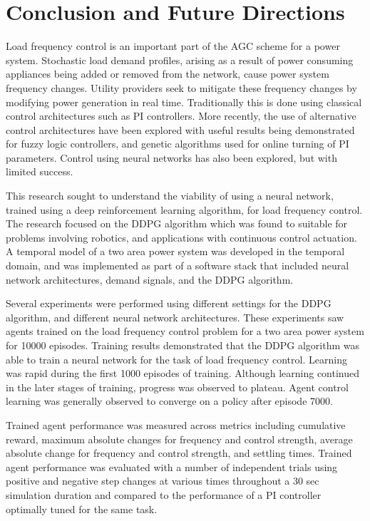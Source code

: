 \chapter{Conclusion and Future Directions}

Load frequency control is an important part of the AGC scheme for a power system. Stochastic load demand profiles, arising as a result of power consuming appliances being added or removed from the network, cause power system frequency changes. Utility providers seek to mitigate these frequency changes by modifying power generation in real time. Traditionally this is done using classical control architectures such as PI controllers. More recently, the use of alternative control architectures have been explored with useful results being demonstrated for fuzzy logic controllers, and genetic algorithms used for online turning of PI parameters. Control using neural networks has also been explored, but with limited success.

This research sought to understand the viability of using a neural network, trained using a deep reinforcement learning algorithm, for load frequency control. The research focused on the DDPG algorithm which was found to suitable for problems involving robotics, and applications with continuous control actuation. A temporal model of a two area power system was developed in the temporal domain, and was implemented as part of a software stack that included neural network architectures, demand signals, and the DDPG algorithm.

Several experiments were performed using different settings for the DDPG algorithm, and different neural network architectures. These experiments saw agents trained on the load frequency control problem for a two area power system for 10000 episodes. Training results demonstrated that the DDPG algorithm was able to train a neural network for the task of load frequency control. Learning was rapid during the first 1000 episodes of training. Although learning continued in the later stages of training, progress was observed to plateau. Agent control learning was generally observed to converge on a policy after episode 7000.

Trained agent performance was measured across metrics including cumulative reward, maximum absolute changes for frequency and control strength, average absolute change for frequency and control strength, and settling times. Trained agent performance was evaluated with a number of independent trials using positive and negative step changes at various times throughout a 30 sec simulation duration and compared to the performance of a PI controller optimally tuned for the same task.

